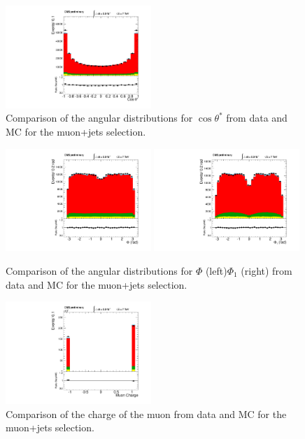 \begin{figure}[h!t]
  {\centering
     \includegraphics[width=0.49\textwidth]{plots/2012_DataMC/mu_hs.pdf}
    \caption{Comparison of the angular distributions for $\cos\theta^{\ast}$ from data and MC 
   for the muon+jets selection.}
\label{fig:mu_thetas}}
\end{figure}
\begin{figure}[h!t]
  {\centering
    \includegraphics[width=0.49\textwidth]{plots/2012_DataMC/mu_phi.pdf}
    \includegraphics[width=0.49\textwidth]{plots/2012_DataMC/mu_phib.pdf}
    \caption{Comparison of the angular distributions for $\Phi$  (left)$\Phi_{1}$ (right) from data and 
      MC for the muon+jets selection.}
\label{fig:mu_phi}}
\end{figure}

\begin{figure}[h!t]
  {\centering
    \includegraphics[width=0.49\textwidth]{plots/2012_DataMC/mu_charge.pdf}
    \caption{Comparison of the charge of the muon from data and MC for the muon+jets selection.}
\label{fig:mu_chg}}
\end{figure}

